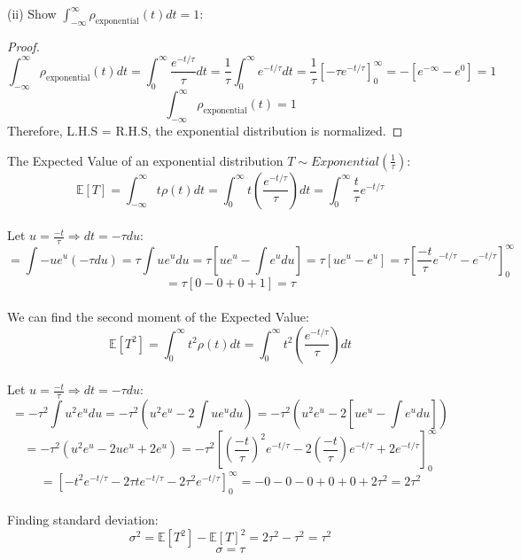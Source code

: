 \documentclass[11pt]{article}
\def\mbb{\mathbb}
\def\E{\mbb{E}}
\theoremstyle{pink}
\theoremstyle{boxedsolution}
\theoremstyle{definition}
\theoremstyle{claim}
\begin{document}
\newpage
(ii) Show $\int^\infty_{-\infty}\rho_{\text{exponential}}(t)dt=1$:
 \begin{proof}
 \[\int^\infty_{-\infty}\rho_{\text{exponential}}(t)dt=\int^\infty_0\frac{e^{-t/\tau}}{\tau}dt=\frac{1}{\tau}\int^\infty_0e^{-t/\tau}dt=\frac{1}{\tau}\left[-\tau e^{-t/\tau}\right]^\infty_0=-\left[e^{-\infty}-e^0\right]=1\]
 \[\int^\infty_{-\infty}\rho_{\text{exponential}}(t)=1\]
 Therefore, L.H.S = R.H.S, the exponential distribution is normalized.
 \end{proof}
 \vspace{4mm}
The Expected Value of an exponential distribution $T \sim Exponential\left(\frac{1}{\tau}\right)$:
\[\E[T]=\int^\infty_{-\infty}t\rho(t)dt=\int^\infty_0t\left(\frac{e^{-t/\tau}}{\tau}\right)dt=\int^\infty_0\frac{t}{\tau}e^{-t/\tau}\]
\vspace{3mm}
\\Let $u=\frac{-t}{\tau} \Rightarrow dt=-\tau du$:
\[=\int-ue^{u}(-\tau du)=\tau\int ue^udu=\tau\left[ue^u-\int e^u du\right]=\tau\left[ue^u-e^u\right]=\tau\left[\frac{-t}{\tau}e^{-t/\tau}-e^{-t/\tau}\right]^\infty_0\]
\[=\tau\left[0-0+0+1\right]=\tau\]
\vspace{3mm}
\\We can find the second moment of the Expected Value:
\[\E[T^2]=\int^\infty_{0}t^2\rho(t)dt=\int^\infty_0t^2\left(\frac{e^{-t/\tau}}{\tau}\right)dt\]
\vspace{3mm}
\\Let $u=\frac{-t}{\tau} \Rightarrow dt=-\tau du$:
\vspace{3mm}
\[=-\tau^2\int u^2e^udu=-\tau^2\left(u^2e^u-2\int ue^udu\right)=-\tau^2\left(u^2e^u-2\left[ue^u-\int e^u du\right]\right)\]
\vspace{3mm}
\[=-\tau^2\left(u^2e^u-2ue^u+2e^u\right)=-\tau^2\left[\left(\frac{-t}{\tau}\right)^2e^{-t/\tau}-2\left(\frac{-t}{\tau}\right)e^{-t/\tau}+2e^{-t/\tau}\right]^\infty_0\]
\vspace{3mm}
\[=\left[-t^2e^{-t/\tau}-2\tau te^{-t/\tau}-2\tau^2e^{-t/\tau}\right]^\infty_0= -0-0-0+0+0+2\tau^2=2\tau^2\]
\vspace{5mm}
\\Finding standard deviation:
\[\sigma^2=\E[T^2]-\E[T]^2=2\tau^2-\tau^2=\tau^2\]
\[\sigma = \tau\]
\end{document}
